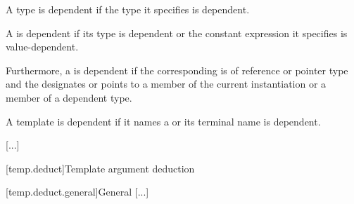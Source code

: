 \documentclass{wg21}
\begin{document}
\pnum
A type
is dependent if the type it specifies is dependent.

\pnum
A 
is dependent if its type is dependent or the constant
expression it specifies is value-dependent.

\pnum
Furthermore, a 
is dependent if the corresponding  
is of reference or pointer type and the 
designates or points to a member of the current instantiation or a member of
a dependent type.

\pnum
A template  is dependent if
it names a  or
its terminal name is dependent.

\textcolor{noteclr}{[...]}

[temp.deduct]{Template argument deduction}

[temp.deduct.general]{General}
\textcolor{noteclr}{[...]}
\end{document}
